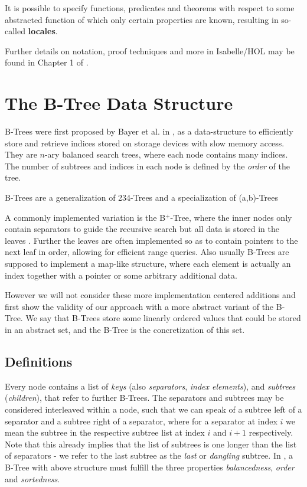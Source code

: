 It is possible to specify functions, predicates
and theorems with respect to some abstracted function
of which only certain properties are known,
resulting in so-called \textbf{locales}.

Further details on notation, proof techniques and more in Isabelle/HOL
may be found in Chapter 1 of \parencite{DBLP:books/sp/NipkowK14}.


\section{The B-Tree Data Structure}

B-Trees were first proposed by Bayer et al. in \parencite{DBLP:journals/acta/BayerM72},
as a data-structure to efficiently store and retrieve indices stored on storage devices
with slow memory access.
They are $n$-ary balanced search trees, where each
node contains many indices.
The number of subtrees and indices in each node is
defined by the \textit{order} of the tree.

B-Trees are a generalization of 234-Trees and a specialization of (a,b)-Trees

A commonly implemented variation is the B$^+$-Tree, where the inner nodes
only contain separators to guide the recursive search
but all data is stored in the leaves \parencite{DBLP:journals/csur/Comer79}.
Further the leaves are often implemented so as to contain pointers
to the next leaf in order, allowing for efficient range queries.
Also usually B-Trees are supposed to implement a map-like
structure, where each element is actually an index together with a pointer
or some arbitrary additional data.

However we will not consider these more implementation centered
additions and first show the validity of our approach
with a more abstract variant of the B-Tree.
We say that B-Trees store some linearly ordered values
that could be stored in an abstract set, and the B-Tree is the concretization
of this set.

\subsection{Definitions}
\label{sec:data_structure_defs}

Every node contains a list of \textit{keys} (also \textit{separators}, \textit{index elements}), and \textit{subtrees} (\textit{children}),
that refer to further B-Trees.
The separators and subtrees may be considered interleaved within a node,
such that we can speak of a subtree left of a separator and a subtree right of a separator,
where for a separator at index $i$ we mean the subtree in the respective
subtree list at index $i$ and $i+1$ respectively.
Note that this already implies that the list of subtrees is one
longer than the list of separators - we refer to the last subtree
as the \textit{last} or \textit{dangling} subtree.
In \parencite{DBLP:journals/acta/BayerM72},
a B-Tree with above structure must fulfill the three properties
\textit{balancedness}, \textit{order} and \textit{sortedness}.

